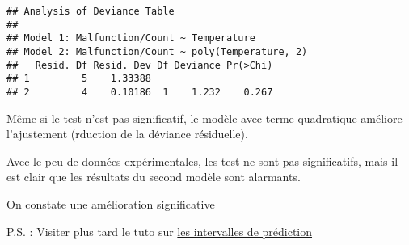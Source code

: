 \documentclass[]{article}
\begin{document}
\begin{verbatim}
## Analysis of Deviance Table
## 
## Model 1: Malfunction/Count ~ Temperature
## Model 2: Malfunction/Count ~ poly(Temperature, 2)
##   Resid. Df Resid. Dev Df Deviance Pr(>Chi)
## 1         5    1.33388                     
## 2         4    0.10186  1    1.232    0.267
\end{verbatim}

Même si le test n'est pas significatif, le modèle avec terme quadratique
améliore l'ajustement (rduction de la déviance résiduelle).

Avec le peu de données expérimentales, les test ne sont pas
significatifs, mais il est clair que les résultats du second modèle sont
alarmants.

On constate une amélioration significative

P.S. : Visiter plus tard le tuto sur
\href{https://www.fromthebottomoftheheap.net/2017/05/01/glm-prediction-intervals-ii/}{les
intervalles de prédiction}
\end{document}
